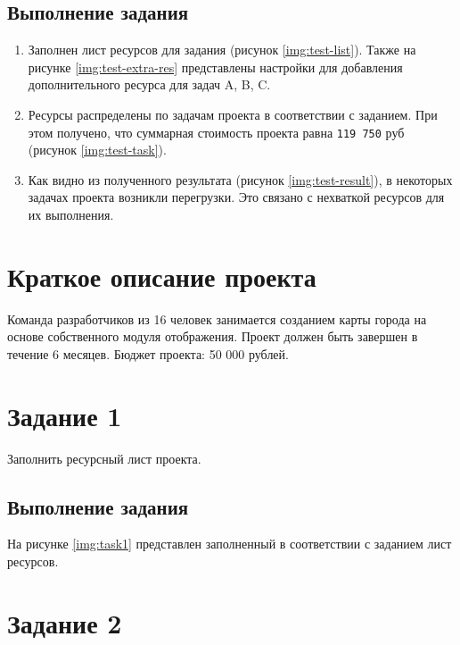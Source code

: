 \subsection{Выполнение задания}

\begin{enumerate}
    \item Заполнен лист ресурсов для задания (рисунок \ref{img:test-list}). Также на рисунке \ref{img:test-extra-res} представлены настройки для добавления дополнительного ресурса для задач A, B, C.

    \item Ресурсы распределены по задачам проекта в соответствии с заданием. При этом получено, что суммарная стоимость проекта равна \texttt{119 750} руб (рисунок \ref{img:test-task}).

    \item Как видно из полученного результата (рисунок \ref{img:test-result}), в некоторых задачах проекта возникли перегрузки. Это связано с нехваткой ресурсов для их выполнения.
\end{enumerate}


\section{Краткое описание проекта}

Команда разработчиков из 16 человек занимается созданием карты города на основе собственного модуля отображения. Проект должен быть завершен в течение 6 месяцев. Бюджет проекта: 50 000 рублей.


\section{Задание 1}

Заполнить ресурсный лист проекта.

\subsection{Выполнение задания}

На рисунке \ref{img:task1} представлен заполненный в соответствии с заданием лист ресурсов.



\section{Задание 2}

